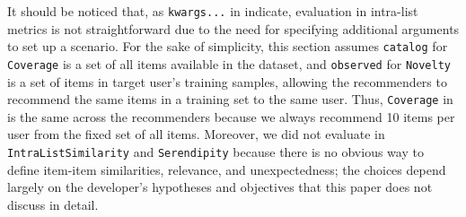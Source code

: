 It should be noticed that, as \texttt{kwargs...} in  indicate, evaluation in intra-list metrics is not straightforward due to the need for specifying additional arguments to set up a scenario. For the sake of simplicity, this section assumes \texttt{catalog} for \texttt{Coverage} is a set of all items available in the dataset, and \texttt{observed} for \texttt{Novelty} is a set of items in target user's training samples, allowing the recommenders to recommend the same items in a training set to the same user. Thus, \texttt{Coverage} in  is the same across the recommenders because we always recommend 10 items per user from the fixed set of all items. Moreover, we did not evaluate in \texttt{IntraListSimilarity} and \texttt{Serendipity} because there is no obvious way to define item-item similarities, relevance, and unexpectedness; the choices depend largely on the developer's hypotheses and objectives that this paper does not discuss in detail.
